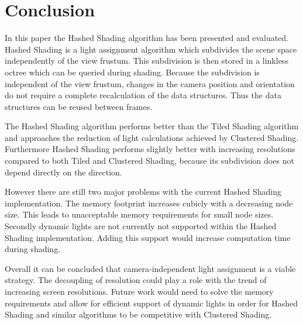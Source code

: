 \section{Conclusion}

In this paper the Hashed Shading algorithm has been presented and evaluated. Hashed Shading is
a light assignment algorithm which subdivides the scene space independently of the
view frustum. This subdivision is then stored in a linkless octree which can be queried during
shading. Because the subdivision is independent of the view frustum, changes in the camera
position and orientation do not require a complete recalculation of the data structures. Thus the
data structures can be reused between frames.

The Hashed Shading algorithm performs better than the Tiled Shading algorithm and
approaches the reduction of light calculations achieved by Clustered Shading.
Furthermore Hashed Shading performs slightly better with increasing resolutions
compared to both Tiled and Clustered Shading, because its subdivision does not
depend directly on the direction.

However there are still two major problems with the current Hashed Shading implementation.
The memory footprint increases cubicly with a decreasing node size. This leads
to unacceptable memory requirements for small node sizes. Secondly dynamic lights
are not currently not supported within the Hashed Shading implementation. Adding
this support would increase computation time during shading.

Overall it can be concluded that camera-independent light assignment is a viable strategy.
The decoupling of resolution could play a role with the trend of increasing screen resolutions.
Future work would need to solve the memory requirements and allow for efficient support
of dynamic lights in order for Hashed Shading and similar algorithms to be competitive with
Clustered Shading.


